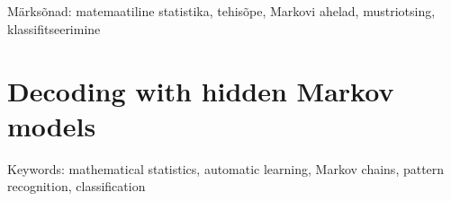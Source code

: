 \section*{\thesisTitle}

Märksõnad: matemaatiline statistika, tehisõpe, Markovi ahelad, mustriotsing, klassifitseerimine

\section*{Decoding with hidden Markov models}

Keywords: mathematical statistics, automatic learning, Markov chains, pattern recognition, classification
